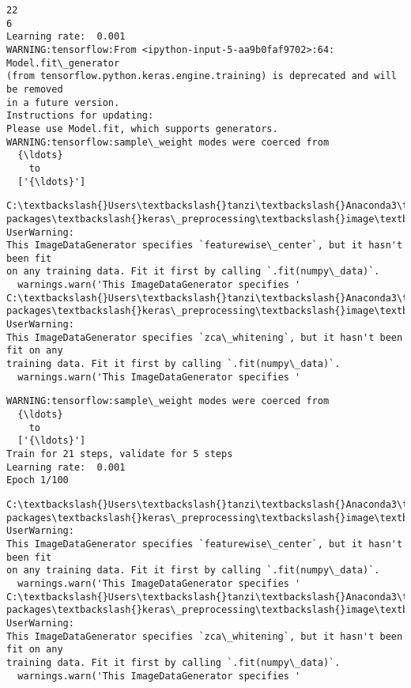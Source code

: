 \documentclass[11pt]{article}
\begin{document}
    \begin{Verbatim}[commandchars=\\\{\}]
22
6
Learning rate:  0.001
WARNING:tensorflow:From <ipython-input-5-aa9b0faf9702>:64: Model.fit\_generator
(from tensorflow.python.keras.engine.training) is deprecated and will be removed
in a future version.
Instructions for updating:
Please use Model.fit, which supports generators.
WARNING:tensorflow:sample\_weight modes were coerced from
  {\ldots}
    to
  ['{\ldots}']
    \end{Verbatim}

    \begin{Verbatim}[commandchars=\\\{\}]
C:\textbackslash{}Users\textbackslash{}tanzi\textbackslash{}Anaconda3\textbackslash{}lib\textbackslash{}site-
packages\textbackslash{}keras\_preprocessing\textbackslash{}image\textbackslash{}image\_data\_generator.py:716: UserWarning:
This ImageDataGenerator specifies `featurewise\_center`, but it hasn't been fit
on any training data. Fit it first by calling `.fit(numpy\_data)`.
  warnings.warn('This ImageDataGenerator specifies '
C:\textbackslash{}Users\textbackslash{}tanzi\textbackslash{}Anaconda3\textbackslash{}lib\textbackslash{}site-
packages\textbackslash{}keras\_preprocessing\textbackslash{}image\textbackslash{}image\_data\_generator.py:735: UserWarning:
This ImageDataGenerator specifies `zca\_whitening`, but it hasn't been fit on any
training data. Fit it first by calling `.fit(numpy\_data)`.
  warnings.warn('This ImageDataGenerator specifies '
    \end{Verbatim}

    \begin{Verbatim}[commandchars=\\\{\}]
WARNING:tensorflow:sample\_weight modes were coerced from
  {\ldots}
    to
  ['{\ldots}']
Train for 21 steps, validate for 5 steps
Learning rate:  0.001
Epoch 1/100
    \end{Verbatim}

    \begin{Verbatim}[commandchars=\\\{\}]
C:\textbackslash{}Users\textbackslash{}tanzi\textbackslash{}Anaconda3\textbackslash{}lib\textbackslash{}site-
packages\textbackslash{}keras\_preprocessing\textbackslash{}image\textbackslash{}image\_data\_generator.py:716: UserWarning:
This ImageDataGenerator specifies `featurewise\_center`, but it hasn't been fit
on any training data. Fit it first by calling `.fit(numpy\_data)`.
  warnings.warn('This ImageDataGenerator specifies '
C:\textbackslash{}Users\textbackslash{}tanzi\textbackslash{}Anaconda3\textbackslash{}lib\textbackslash{}site-
packages\textbackslash{}keras\_preprocessing\textbackslash{}image\textbackslash{}image\_data\_generator.py:735: UserWarning:
This ImageDataGenerator specifies `zca\_whitening`, but it hasn't been fit on any
training data. Fit it first by calling `.fit(numpy\_data)`.
  warnings.warn('This ImageDataGenerator specifies '
    \end{Verbatim}
\end{document}
